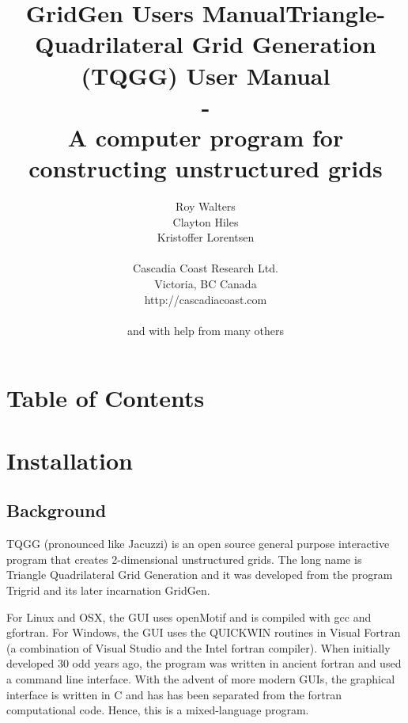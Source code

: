 \documentclass{article}
\title{GridGen Users Manual}
\begin{document}
\title{Triangle-Quadrilateral Grid Generation (TQGG) User Manual \\ - \\
 A computer program for constructing unstructured grids }

\author{Roy Walters \\
  Clayton Hiles \\
  Kristoffer Lorentsen \\ \\
  Cascadia Coast Research Ltd. \\
  Victoria, BC Canada \\
  http://cascadiacoast.com \\ \\
  and with help from many others}

  
\maketitle

\newpage
\section*{Table of Contents}

\setcounter{tocdepth}{2}
\tableofcontents


\newpage
\section{Installation}

\subsection{Background}
TQGG (pronounced like Jacuzzi) is an open source general purpose interactive program that creates
2-dimensional unstructured grids. The long name is Triangle Quadrilateral Grid Generation and it was
developed from the program Trigrid and its later incarnation GridGen.

For Linux and OSX, the GUI uses openMotif and is compiled with gcc and gfortran. 
For Windows, the GUI uses the QUICKWIN routines in Visual Fortran (a combination of
Visual Studio and the Intel fortran compiler). When initially developed 30 odd years 
ago, the program was written in ancient fortran and used a command line interface. With
the advent of more modern GUIs, the graphical interface is written in C and has has 
been separated from the fortran computational code. Hence, this is a mixed-language program.
\end{document}
